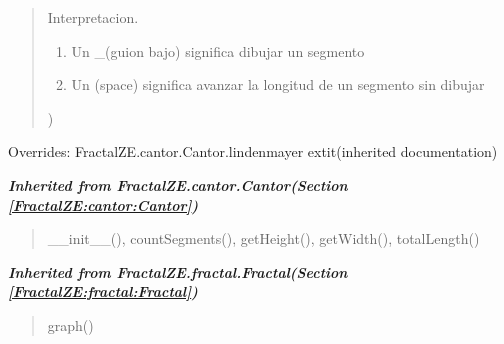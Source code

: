 \begin{boxedminipage}{\funcwidth}
\begin{quote}
{      Interpretacion.

      \begin{enumerate}

      \setlength{\parskip}{0.5ex}
        \item Un \_(guion bajo) significa dibujar un segmento

        \item Un (space) significa avanzar la longitud de un segmento sin 
          dibujar

      \end{enumerate})}

      \end{quote}

      Overrides: FractalZE.cantor.Cantor.lindenmayer 	extit{(inherited documentation)}

    \end{boxedminipage}


\large{\textbf{\textit{Inherited from FractalZE.cantor.Cantor\textit{(Section \ref{FractalZE:cantor:Cantor})}}}}

\begin{quote}
\_\_init\_\_(), countSegments(), getHeight(), getWidth(), totalLength()
\end{quote}

\large{\textbf{\textit{Inherited from FractalZE.fractal.Fractal\textit{(Section \ref{FractalZE:fractal:Fractal})}}}}

\begin{quote}
graph()
\end{quote}
